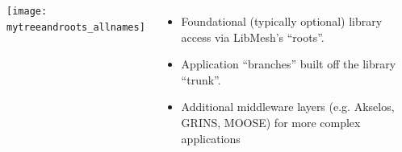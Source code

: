 \documentclass[mathserif]{beamer}
\begin{document}
\begin{frame}[t]
  \begin{columns}
    \begin{center}
      \texttt{[image: mytreeandroots\_allnames]}
    \end{center}
    \begin{itemize}
      \item Foundational (typically optional) library access via LibMesh's ``roots''.
      \item Application ``branches'' built off the library ``trunk''.
      \item Additional middleware layers (e.g. Akselos, GRINS, MOOSE) for more complex applications
    \end{itemize}
  \end{columns}

\end{frame}
\end{document}
